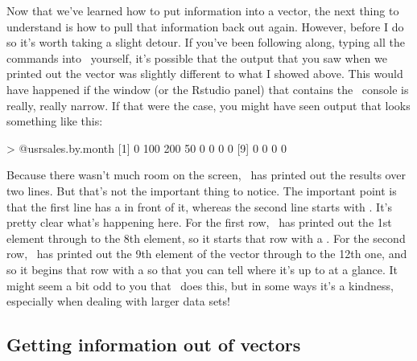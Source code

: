 Now that we've learned how to put information into a vector, the next  thing to understand is how to pull that information back out again. However, before I do so it's worth taking a slight detour. If you've been following along, typing all the commands into \R\ yourself, it's possible that the output that you saw when we printed out the  vector was slightly different to what I showed above. This would have happened if the window (or the Rstudio panel) that contains the \R\ console is really, really narrow. If that were the case, you might have seen output that looks something like this:
\begin{rblock1}
> @usr{sales.by.month}
 [1]   0 100 200  50   0   0   0   0
 [9]   0   0   0   0
\end{rblock1}
Because there wasn't much room on the screen, \R\ has printed out the results over two lines. But that's not the important thing to notice. The important point is that the first line has a \rtextoutput{[1]} in front of it, whereas the second line starts with \rtextoutput{[9]}. It's pretty clear what's happening here. For the first row, \R\ has printed out the 1st element through to the 8th element, so it starts that row with a \rtextoutput{[1]}. For the second row, \R\ has printed out the 9th element of the vector through to the 12th one, and so it begins that row with a \rtextoutput{[9]} so that you can tell where it's up to at a glance. It might seem a bit odd to you that \R\ does this, but in some ways it's a kindness, especially when dealing with larger data sets!


\subsection{Getting information out of vectors\label{sec:vectorsubset}}

